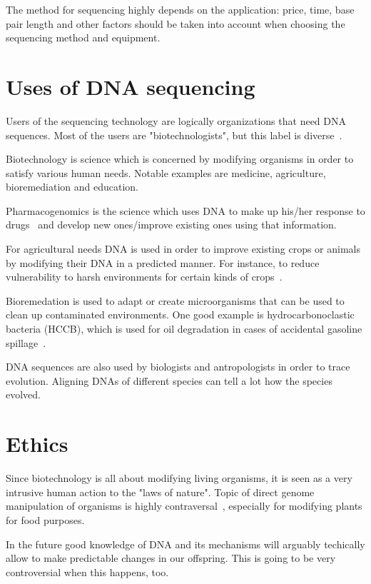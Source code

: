 \documentclass[english,11pt]{article}
\numberwithin{equation}{section}
\begin{document}
The method for sequencing highly depends on the application: price, time, base
pair length and other factors should be taken into account when choosing the
sequencing method and equipment.

\section{Uses of DNA sequencing}

Users of the sequencing technology are logically organizations that need DNA
sequences. Most of the users are "biotechnologists", but this label is
diverse~\cite{biotech}.

Biotechnology is science which is concerned by modifying organisms in order to
satisfy various human needs. Notable examples are medicine, agriculture,
bioremediation and education.

Pharmacogenomics is the science which uses DNA to make up his/her response to
drugs~\cite{pharmacogenomics} and develop new ones/improve existing ones using
that information.

For agricultural needs DNA is used in order to improve existing crops or animals
by modifying their DNA in a predicted manner. For instance, to reduce
vulnerability to harsh environments for certain kinds of crops~\cite{drought}.

Bioremedation is used to adapt or create microorganisms that can be used to
clean up contaminated environments. One good example is hydrocarbonoclastic
bacteria (HCCB), which is used for oil degradation in cases of accidental
gasoline spillage~\cite{oil-degradation}.

DNA sequences are also used by biologists and antropologists in order to trace
evolution. Aligning DNAs of different species can tell a lot how the species
evolved.

\section{Ethics}

Since biotechnology is all about modifying living organisms, it is seen as a
very intrusive human action to the "laws of nature". Topic of direct genome
manipulation of organisms is highly contraversal~\cite{food}, especially for
modifying plants for food purposes.

In the future good knowledge of DNA and its mechanisms will arguably techically
allow to make predictable changes in our offspring. This is going to be very
controversial when this happens, too.
\end{document}
